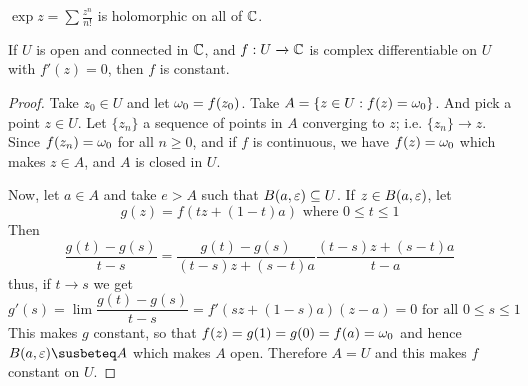 \begin{example}\label{example_3.3}
    $\exp{z}=\sum{\frac{z^n}{n!}}$ is holomorphic on all of $\mathbb{C}$.
\end{example}

\begin{lemma}\label{3.2.5}
    If $U$ is open and connected in $\mathbb{C}$, and $f:U \xrightarrow{} \mathbb{C}$ is complex
    differentiable on $U$ with  $f'(z)=0$, then $f$ is constant.
\end{lemma}
\begin{proof}
    Take $z_0 \in U$ and let $\omega_0=f(z_0)$. Take $A=\{z \in U : f(z)=\omega_0\}$.
    And pick a point $z \in U$. Let  $\{z_n\}$ a sequence of points in $A$
    converging to $z$; i.e. $\{z_n\} \xrightarrow{} z$. Since $f(z_n)=\omega_0$ for
    all $n \geq 0$, and if  $f$ is continuous, we have  $f(z)=\omega_0$ which makes
    $z \in A$, and  $A$ is closed in $U$.

    Now, let $a \in A$ and take $e>A$ such that $B(a,\varepsilon) \subseteq U$. If $z \in
    B(a,\varepsilon)$, let
    \begin{equation*}
        g(z)=f(tz+(1-t)a) \text{ where } 0 \leq t \leq 1
    \end{equation*}
    Then
    \begin{equation*}
        \frac{g(t)-g(s)}{t-s}=\frac{g(t)-g(s)}{(t-s)z+(s-t)a}\frac{(t-s)z+(s-t)a}{t-a}
    \end{equation*}
    thus, if $t \xrightarrow{} s$ we get
    \begin{equation*}
         g'(s)=\lim{\frac{g(t)-g(s)}{t-s}}=f'(sz+(1-s)a)(z-a)=0 \text{ for all }
         0 \leq s \leq 1
    \end{equation*}
    This makes $g$ constant, so that $f(z)=g(1)=g(0)=f(a)=\omega_0$ and hence
    $B(a,\e) \susbeteq A$ which makes $A$ open. Therefore  $A=U$ and this makes
     $f$ constant on  $U$.
\end{proof}

